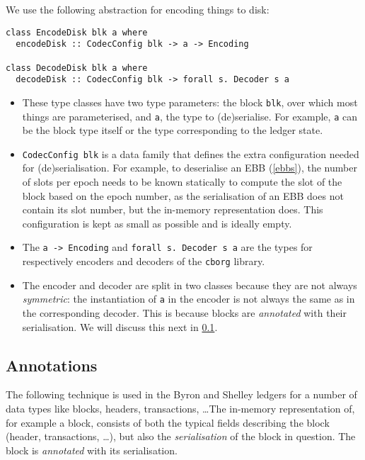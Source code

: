 We use the following abstraction for encoding things to disk:

\begin{lstlisting}
class EncodeDisk blk a where
  encodeDisk :: CodecConfig blk -> a -> Encoding

class DecodeDisk blk a where
  decodeDisk :: CodecConfig blk -> forall s. Decoder s a
\end{lstlisting}

\begin{itemize}
\item These type classes have two type parameters: the block \lstinline!blk!,
  over which most things are parameterised, and \lstinline!a!, the type to
  (de)serialise. For example, \lstinline!a! can be the block type itself or the
  type corresponding to the ledger state.
\item \lstinline!CodecConfig blk! is a data family that defines the extra
  configuration needed for (de)serialisation. For example, to deserialise an EBB
  (\cref{ebbs}), the number of slots per epoch needs to be known statically to
  compute the slot of the block based on the epoch number, as the serialisation
  of an EBB does not contain its slot number, but the in-memory representation
  does. This configuration is kept as small as possible and is ideally empty.
\item The \lstinline!a -> Encoding! and \lstinline!forall s. Decoder s a! are
  the types for respectively encoders and decoders of the \lstinline!cborg!
  library.
\item The encoder and decoder are split in two classes because they are not
  always \emph{symmetric}: the instantiation of \lstinline!a! in the encoder is
  not always the same as in the corresponding decoder. This is because blocks
  are \emph{annotated} with their serialisation. We will discuss this next in
  \cref{serialisation:storage:annotations}.
\end{itemize}

\subsection{Annotations}
\label{serialisation:storage:annotations}

The following technique is used in the Byron and Shelley ledgers for a number of
data types like blocks, headers, transactions, \ldots The in-memory representation
of, for example a block, consists of both the typical fields describing the
block (header, transactions, \ldots), but also the \emph{serialisation} of the block
in question. The block is \emph{annotated} with its serialisation.

